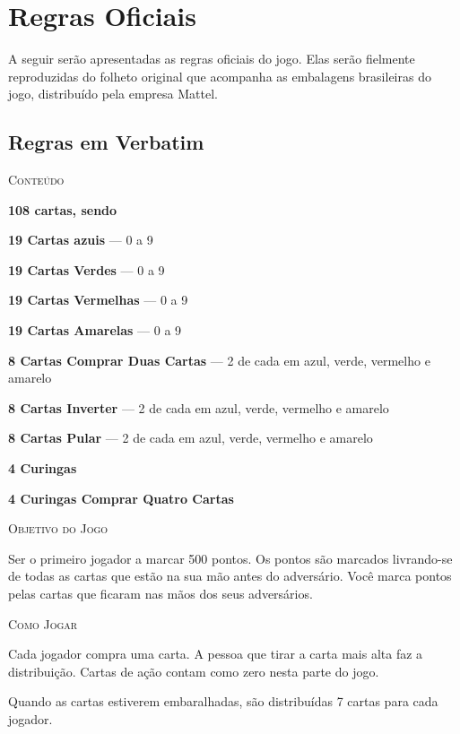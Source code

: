 \section{Regras Oficiais}

\label{oficiais}

A seguir serão apresentadas as regras oficiais do jogo. Elas serão fielmente reproduzidas do folheto original que acompanha as embalagens brasileiras do jogo, distribuído pela empresa Mattel. 

\subsection{Regras em Verbatim}

\vspace{0.5cm}

\textsc{\large{Conteúdo}}

\textbf{108 cartas, sendo}

\textbf{19 Cartas azuis} --- 0 a 9

\textbf{19 Cartas Verdes} --- 0 a 9

\textbf{19 Cartas Vermelhas} --- 0 a 9

\textbf{19 Cartas Amarelas} --- 0 a 9

\textbf{8 Cartas Comprar Duas Cartas} --- 2 de cada em azul, verde, vermelho e amarelo

\textbf{8 Cartas Inverter} --- 2 de cada em azul, verde, vermelho e amarelo

\textbf{8 Cartas Pular} --- 2 de cada em azul, verde, vermelho e amarelo

\textbf{4 Curingas}

\textbf{4 Curingas Comprar Quatro Cartas}

\vspace{0.5cm}

\textsc{\large{Objetivo do Jogo}}

Ser o primeiro jogador a marcar 500 pontos. Os pontos são marcados livrando-se de todas as cartas que estão na sua mão antes do adversário. Você marca pontos pelas cartas que ficaram nas mãos dos seus adversários.

\vspace{0.5cm}

\textsc{\large{Como Jogar}}

Cada jogador compra uma carta. A pessoa que tirar a carta mais alta faz a distribuição. Cartas de ação contam como zero nesta parte do jogo.

Quando as cartas estiverem embaralhadas, são distribuídas 7 cartas para cada jogador.

